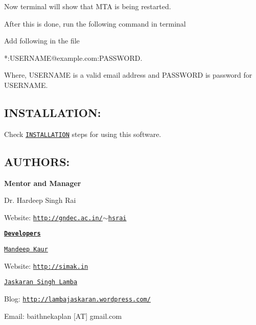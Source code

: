 Now terminal will show that M\-T\-A is being restarted.\par
 After this is done, run the following command in terminal 


Add following in the file \begin{DoxyVerb}*:USERNAME@example.com:PASSWORD.

Where, USERNAME is  a valid email address and PASSWORD is  password for USERNAME.
\end{DoxyVerb}


\subsection*{I\-N\-S\-T\-A\-L\-L\-A\-T\-I\-O\-N\-: }

Check \href{https://github.com/GreatDevelopers/bakaplan/blob/master/INSTALLATION.txt}{\tt I\-N\-S\-T\-A\-L\-L\-A\-T\-I\-O\-N} steps for using this software.

\subsection*{A\-U\-T\-H\-O\-R\-S\-: }

{\bfseries Mentor and Manager}

Dr. Hardeep Singh Rai

Website\-: \href{http://gndec.ac.in/~hsrai}{\tt http\-://gndec.\-ac.\-in/$\sim$hsrai}

{\bfseries \href{https://github.com/GreatDevelopers/bakaplan/wiki/Contributors}{\tt Developers}}

\href{https://github.com/megha55}{\tt Mandeep Kaur}

Website\-: \href{http://simak.in}{\tt http\-://simak.\-in}

\href{https://github.com/Jaskaran28193}{\tt Jaskaran Singh Lamba}

Blog\-: \href{http://lambajaskaran.wordpress.com/}{\tt http\-://lambajaskaran.\-wordpress.\-com/}

Email\-: baithnekaplan \mbox{[}A\-T\mbox{]} gmail.\-com 